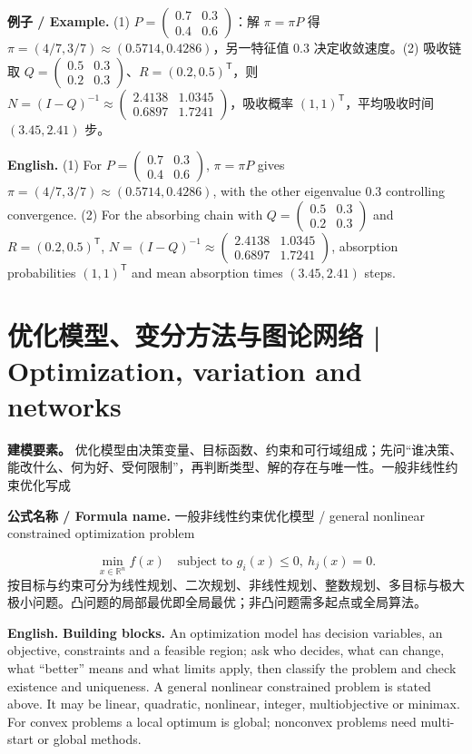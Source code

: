 \documentclass[UTF8,11pt,a4paper]{ctexart}
\newcommand{\EN}[1]{\par\noindent\textbf{English.} #1\par}
\newcommand{\FORMULA}[2]{\par\noindent\textbf{公式名称 / Formula name.} #1 / #2\par}
\newcommand{\EX}[2]{\par\noindent\textbf{例子 / Example.} #1\par\EN{#2}}
\begin{document}
\EX{(1) $P=\begin{pmatrix}0.7&0.3\\0.4&0.6\end{pmatrix}$：解 $\pi=\pi P$ 得 $\pi=(4/7,3/7)\approx(0.5714,0.4286)$，另一特征值 $0.3$ 决定收敛速度。(2) 吸收链取 $Q=\begin{pmatrix}0.5&0.3\\0.2&0.3\end{pmatrix}$、$R=(0.2,0.5)^{\mathsf T}$，则 $N=(I-Q)^{-1}\approx\begin{pmatrix}2.4138&1.0345\\0.6897&1.7241\end{pmatrix}$，吸收概率 $(1,1)^{\mathsf T}$，平均吸收时间 $(3.45,2.41)$ 步。}{(1) For $P=\begin{pmatrix}0.7&0.3\\0.4&0.6\end{pmatrix}$, $\pi=\pi P$ gives $\pi=(4/7,3/7)\approx(0.5714,0.4286)$, with the other eigenvalue $0.3$ controlling convergence. (2) For the absorbing chain with $Q=\begin{pmatrix}0.5&0.3\\0.2&0.3\end{pmatrix}$ and $R=(0.2,0.5)^{\mathsf T}$, $N=(I-Q)^{-1}\approx\begin{pmatrix}2.4138&1.0345\\0.6897&1.7241\end{pmatrix}$, absorption probabilities $(1,1)^{\mathsf T}$ and mean absorption times $(3.45,2.41)$ steps.}


\section{优化模型、变分方法与图论网络 | Optimization, variation and networks}
\noindent\textbf{建模要素。} 优化模型由决策变量、目标函数、约束和可行域组成；先问“谁决策、能改什么、何为好、受何限制”，再判断类型、解的存在与唯一性。一般非线性约束优化写成
\FORMULA{一般非线性约束优化模型}{general nonlinear constrained optimization problem}
\[
\min_{x\in\mathbb R^n}f(x)\quad\text{subject to }g_i(x)\le0,\ h_j(x)=0 .
\]
按目标与约束可分为线性规划、二次规划、非线性规划、整数规划、多目标与极大极小问题。凸问题的局部最优即全局最优；非凸问题需多起点或全局算法。
\EN{\textbf{Building blocks.} An optimization model has decision variables, an objective, constraints and a feasible region; ask who decides, what can change, what “better” means and what limits apply, then classify the problem and check existence and uniqueness. A general nonlinear constrained problem is stated above. It may be linear, quadratic, nonlinear, integer, multiobjective or minimax. For convex problems a local optimum is global; nonconvex problems need multi-start or global methods.}
\end{document}
